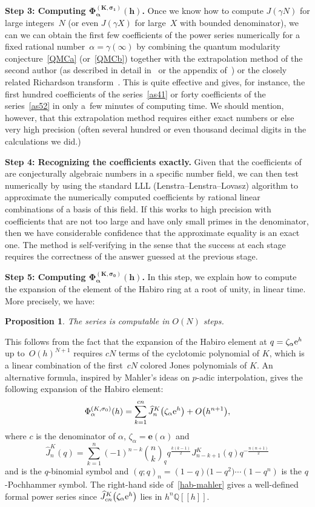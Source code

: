 \documentclass[pdftex]{sigma}
\numberwithin{equation}{section}
\newtheorem{Proposition}[Theorem]{Proposition}
\def\BQ{\mathbb Q}
\def\z{\zeta}
\def\e{\mathbf{e}}
\def\a{\alpha}
\def\e{\mathbf{e}}
\def\a{\alpha}
\def\z{\zeta}
\def\s{\sigma}
\def\be{\begin{equation}}
\def\ee{\end{equation}}
\def\g{\gamma}
\begin{document}
{\bf Step 3: Computing $\boldsymbol{\Phi_\a^{(K,\s_1)}(h)}$.}
Once we know how to compute $J(\g N)$ for large integers~$N$ (or even $J(\g X)$
for large~$X$ with bounded denominator), we can we can obtain the first few
coefficients of the power series \smash{$\Phi^{(K,\s_1)}_{\a}(h)$} numerically for a fixed
rational number~$\a=\g(\infty)$ by combining the quantum modularity conjecture~\eqref{QMCa} (or~\eqref{QMCb})
together with the extrapolation method of the second author (as described in detail
in~\cite{GrMor} or the appendix of~\cite{GV}) or the closely related
Richardson transform~\cite[Chapter~8]{Bender}. This is quite effective and gives, for
instance, the first hundred coefficients of the series~\eqref{as41} or forty
coefficients of the series~\eqref{as52} in only a~few minutes of computing time.
We should mention, however, that this extrapolation method requires either exact
numbers or else very high precision (often several hundred or even thousand decimal
digits in the calculations we did.)

{\bf Step 4: Recognizing the coefficients exactly.}
Given that the coefficients of \smash{$\Phi^{(K,\s_1)}_{\a}(h)$}
are conjecturally algebraic
numbers in a specific number field, we can then test numerically by using
the standard LLL (Lenstra--Lenstra--Lovasz) algorithm to approximate the
numerically computed coefficients by rational linear combinations of
a basis of this field. If this works to high precision with coefficients
that are not too large and have only small primes in the denominator, then
we have considerable confidence that the approximate equality is an exact one.
The method is self-verifying in the sense that the success at each
stage requires the correctness of the answer guessed at the previous stage.

{\bf Step 5: Computing $\boldsymbol{\Phi_\a^{(K,\s_0)}(h)}$.}
In this step, we explain how to compute the expansion of the element
of the Habiro ring at a root of unity, in linear time. More precisely,
we have:

\begin{Proposition} \label{prop.hab}
The series \smash{$\Phi^{(K,\s_0)}_\a(h) + O(h)^{N+1}$} is computable in $O(N)$ steps.
\end{Proposition}
This follows from the fact that the expansion of the Habiro element at
$q=\z_\a {\rm e}^h$ up to~$O(h)^{N+1}$ requires $cN$ terms of the
cyclotomic polynomial of $K$, which is a linear combination of the
first~$cN$ colored Jones polynomials of $K$. An alternative formula,
inspired by Mahler's ideas on $p$-adic interpolation, gives the
following expansion of the Habiro element:
\be
\label{hab-mahler}
\Phi^{(K,\s_0)}_\a(h) = \sum_{k=1}^{cn} \widehat{J}^K_n\big(\z_\a {\rm e}^h\big) + O\big(h^{n+1}\big),
\ee
where $c$ is the denominator of $\a$, $\z_\a=\e(\a)$ and
\[%
\widehat{J}^K_n(q) = \sum_{k=1}^n (-1)^{n-k} \binom{n}{k}_q
q^{\frac{k(k-1)}{2}} J^K_{n-k+1}(q)  q^{-\frac{n(n+1)}{2}}
\]
and  is the $q$-binomial
symbol and $(q;q)_n=(1-q)\big(1-q^2\big)\cdots\allowbreak (1-q^n)$ is the $q$-Pochhammer
symbol. The right-hand side of~\eqref{hab-mahler} gives
a well-defined formal power series since $\widehat{J}^K_{cn}\big(\z_\a {\rm e}^h\big)$ lies
in $h^n \BQ[[h]]$.
\end{document}

